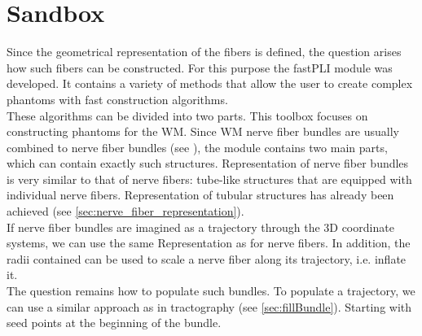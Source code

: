 \section{Sandbox}
% 
Since the geometrical representation of the fibers is defined, the question arises how such fibers can be constructed.
For this purpose the \ac{fastPLI} module  was developed.
It contains a variety of methods that allow the user to create complex phantoms with fast construction algorithms.
\\
% 
These algorithms can be divided into two parts.
This toolbox focuses on constructing phantoms for the \ac{WM}.
Since \ac{WM} nerve fiber bundles are usually combined to nerve fiber bundles (see \dummy), the  module contains two main parts, which can contain exactly such structures.
%
Representation of nerve fiber bundles is very similar to that of nerve fibers: tube-like structures that are equipped with individual nerve fibers.
Representation of tubular structures has already been achieved (see \cref{sec:nerve_fiber_representation}).
\\
If nerve fiber bundles are imagined as a trajectory through the 3D coordinate systems, we can use the same Representation as for nerve fibers.
In addition, the radii contained can be used to scale a nerve fiber along its trajectory, i.e. inflate it.
\\
% 
The question remains how to populate such bundles.
To populate a trajectory, we can use a similar approach as in tractography (see \cref{sec:fillBundle}).
Starting with seed points at the beginning of the bundle.
% 
